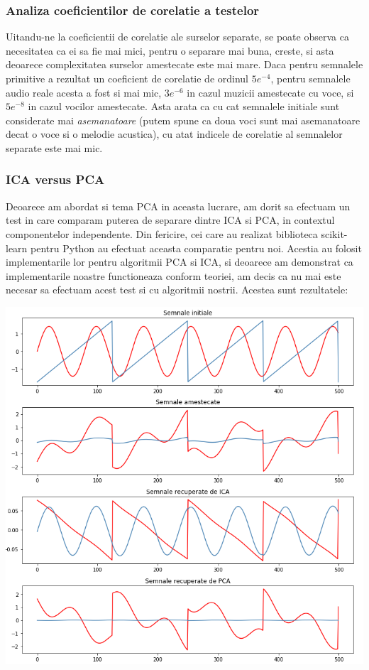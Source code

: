 \documentclass[12pt]{article}
\begin{document}
\subsubsection{Analiza coeficientilor de corelatie a testelor}
Uitandu-ne la coeficientii de corelatie ale surselor separate, se poate observa ca necesitatea ca ei sa fie mai mici, pentru o separare mai buna, creste, si asta deoarece complexitatea surselor amestecate este mai mare. Daca pentru semnalele primitive a rezultat un coeficient de corelatie de ordinul $5e^{-4}$, pentru semnalele audio reale acesta a fost si mai mic, $3e^{-6}$ in cazul muzicii amestecate cu voce, si $5e^{-8}$ in cazul vocilor amestecate. Asta arata ca cu cat semnalele initiale sunt considerate mai \textit{asemanatoare} (putem spune ca doua voci sunt mai asemanatoare decat o voce si o melodie acustica), cu atat indicele de corelatie al semnalelor separate este mai mic.

\subsubsection{ICA versus PCA}
Deoarece am abordat si tema PCA in aceasta lucrare, am dorit sa efectuam un test in care comparam puterea de separare dintre ICA si PCA, in contextul componentelor independente. Din fericire, cei care au realizat biblioteca scikit-learn pentru Python au efectuat aceasta comparatie pentru noi. Acestia au folosit implementarile lor pentru algoritmii PCA si ICA, si deoarece am demonstrat ca implementarile noastre functioneaza conform teoriei, am decis ca nu mai este necesar sa efectuam acest test si cu algoritmii nostrii. Acestea sunt rezultatele:
\begin{center}
	\includegraphics[width=\linewidth]{pca_vs_ica}
 \end{center}
\end{document}
